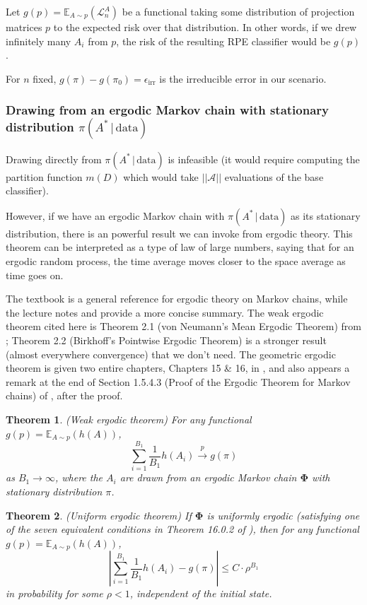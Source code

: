 \documentclass[ejs,preprint]{imsart}
\newtheorem{theorem}{Theorem}
\newcommand\E{\mathbb{E}}
\newcommand\risk{\mathcal{L}}
\begin{document}
Let $g(p)=\E_{A\sim p}(\risk_n^A)$ be a functional taking some distribution of projection matrices $p$ to the expected risk over that distribution. In other words, if we drew infinitely many $A_i$ from $p$, the risk of the resulting RPE classifier would be $g(p)$.

For $n$ fixed, $g(\pi)-g(\pi_0)=\epsilon_\mathrm{irr}$ is the irreducible error in our scenario.

\subsubsection{Drawing from an ergodic Markov chain with stationary distribution $\pi(A^*\,|\,\mathrm{data})$}

Drawing directly from $\pi(A^*\,|\,\mathrm{data})$ is infeasible (it would require computing the partition function $m(D)$ which would take $||\mathcal A||$ evaluations of the base classifier).

However, if we have an ergodic Markov chain with $\pi(A^*\,|\,\mathrm{data})$ as its stationary distribution, there is an powerful result we can invoke from ergodic theory. This theorem can be interpreted as a type of law of large numbers, saying that for an ergodic random process, the time average moves closer to the space average as time goes on.

The textbook \cite{MT93} is a general reference for ergodic theory on Markov chains, while the lecture notes \cite{Sarig08} and \cite{Geyer12} provide a more concise summary. The weak ergodic theorem cited here is Theorem 2.1 (von Neumann's Mean Ergodic Theorem) from \cite{Sarig08}; Theorem 2.2 (Birkhoff's Pointwise Ergodic Theorem) is a stronger result (almost everywhere convergence) that we don't need. The geometric ergodic theorem is given two entire chapters, Chapters 15 \& 16, in \cite{MT93}, and also appears a remark at the end of Section 1.5.4.3 (Proof of the Ergodic Theorem for Markov chains) of \cite{Sarig08}, after the proof.

\begin{theorem}
(Weak ergodic theorem) For any functional $g(p)=\E_{A\sim p}(h(A))$, 
\[
\sum_{i=1}^{B_1}\frac{1}{B_1} h(A_i) \overset{p}{\to} g(\pi)
\]
as $B_1\to\infty$, where the $A_i$ are drawn from an ergodic Markov chain $\bm{\Phi}$ with stationary distribution $\pi$.
\end{theorem}

\begin{theorem}
(Uniform ergodic theorem) If $\bm\Phi$ is uniformly ergodic (satisfying one of the seven equivalent conditions in Theorem 16.0.2 of \cite{MT93}), then for any functional $g(p)=\E_{A\sim p}(h(A))$, 
\[
\left|\sum_{i=1}^{B_1}\frac{1}{B_1} h(A_i)-g(\pi)\right|\leq C\cdot \rho^{B_1}
\]
in probability for some $\rho<1$, independent of the initial state.
\end{theorem}
\end{document}
